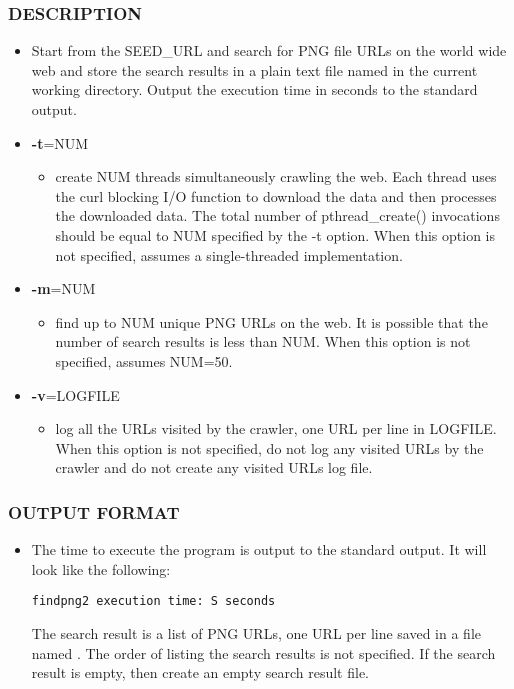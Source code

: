 \subsubsection*{DESCRIPTION}
\begin{itemize}
\item[]Start from the SEED\_URL and search for PNG file URLs on the world wide web and store the search results in a plain text file named  in the current working directory. Output the execution time in seconds to the standard output.
\item[] {\bf -t}=NUM
  \begin{itemize}
  \item[] create NUM threads simultaneously crawling the web. Each thread uses the curl blocking I/O function to download the data and then processes the downloaded data. The total number of pthread\_create() invocations should be equal to NUM specified by the -t option. When this option is not specified, assumes a single-threaded implementation.
  \end{itemize}
\item[] {\bf -m}=NUM
  \begin{itemize}
  \item[] find up to NUM unique PNG URLs on the web. It is possible that the number of search results is less than NUM. When this option is not specified, assumes NUM=50. 
  \end{itemize}
\item[] {\bf -v}=LOGFILE
  \begin{itemize}
  \item[] log all the URLs visited by the crawler, one URL per line in LOGFILE. When this option is not specified, do not log any visited URLs by the crawler and do not create any visited URLs log file.
  \end{itemize}
\end{itemize}
\subsubsection*{OUTPUT FORMAT}
\begin{itemize}
\item[]The time to execute the program is output to the standard output. It will look like the following:
\begin{verbatim}
findpng2 execution time: S seconds
\end{verbatim}
  The search result is a list of PNG URLs, one URL per line saved in a file named . The order of listing the search results is not specified. If the search result is empty, then create an empty search result file.
\end{itemize}
